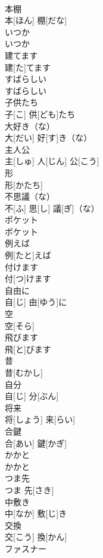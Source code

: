 \documentclass[8pt]{extreport}
\begin{document}
\begin{CJK}{UTF8}{min}
\\	本棚	
\\	本[ほん] 棚[だな]		
\\	いつか	
\\	いつか		
\\	建てます	
\\	建[た]てます		
\\	すばらしい	
\\	すばらしい		
\\	子供たち	
\\	子[こ] 供[ども]たち		
\\	大好き（な）	
\\	大[だい] 好[す]き（な）		
\\	主人公	
\\	主[しゅ] 人[じん] 公[こう]		
\\	形	
\\	形[かたち]		
\\	不思議（な）	
\\	不[ふ] 思[し] 議[ぎ]（な）		
\\	ポケット	
\\	ポケット		
\\	例えば	
\\	例[たと]えば		
\\	付けます	
\\	付[つ]けます		
\\	自由に	
\\	自[じ] 由[ゆう]に		
\\	空	
\\	空[そら]		
\\	飛びます	
\\	飛[と]びます		
\\	昔	
\\	昔[むかし]		
\\	自分	
\\	自[じ] 分[ぶん]		
\\	将来	
\\	将[しょう] 来[らい]		
\\	合鍵	
\\	合[あい] 鍵[かぎ]		
\\	かかと	
\\	かかと		
\\	つま先	
\\	つま 先[さき]		
\\	中敷き	
\\	中[なか] 敷[じ]き		
\\	交換	
\\	交[こう] 換[かん]		
\\	ファスナー	

\end{CJK}
\end{document}
